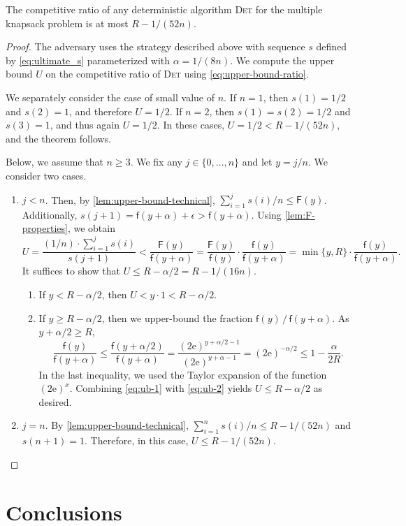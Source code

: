 \documentclass[a4paper,USenglish,cleveref]{lipics-v2019}
\newcommand{\e}{\mathrm{e}}
\newcommand{\R}{\ensuremath{R}}
\newcommand{\f}{\textsf{f}}
\newcommand{\fintegral}{\textsf{F}}
\newcommand{\DET}{\textsc{Det}\xspace}
\newcommand\maciek[1]{\texthl{#1}}
\begin{document}
\begin{theorem}
\label{thm:upper-bound}
The competitive ratio of any deterministic algorithm \DET for the multiple knapsack problem 
is at most $\R - 1/(52 n)$.
\end{theorem}

\begin{proof}
The adversary uses the strategy described above
with sequence $s$ defined by \eqref{eq:ultimate_s} parameterized
with $\alpha = 1/(8n)$. We compute the upper bound $U$ on the competitive ratio
of \DET using \eqref{eq:upper-bound-ratio}.

We separately consider the case of small value of $n$.
If $n = 1$, then $s(1) = 1/2$ and $s(2) = 1$, and therefore 
$U = 1/2$. If $n = 2$, then $s(1) = s(2) = 1/2$ and $s(3) = 1$,
and thus again $U = 1/2$. In these cases, $U = 1/2 < R - 1/(52n)$, and 
the theorem follows. 

Below, we assume that $n \geq 3$.
We fix any $j \in \{0, \ldots, n\}$ and let $y = j/n$.
We consider two cases. 

\begin{enumerate}
\item $j < n$. 
Then, by \cref{lem:upper-bound-technical}, $\sum_{i=1}^j s(i)/n \leq \fintegral(y)$. 
Additionally, $s(j+1) = \f(y+\alpha) + \epsilon > \f(y + \alpha)$. 
Using \cref{lem:F-properties}, we obtain
\begin{equation}
\label{eq:ub-1}
U = \frac{ (1/n) \cdot \sum_{i = 1}^{j} s(i)}{s(j+1)}
  < \frac{\fintegral(y)}{\f(y + \alpha)} 
  = \frac{\fintegral(y)}{\f(y)} \cdot \frac{\f(y)}{\f(y + \alpha)} 
  = \min\{y, \R\} \cdot \frac{\f(y)}{\f(y + \alpha)}.
\end{equation}
It suffices to show that $U \leq R - \alpha/2 = R - 1/(16n)$. 
\begin{enumerate}
\item If $y < \R - \alpha/2$, then $U < y \cdot 1 < \R - \alpha/2$.
\item If $y \geq \R - \alpha/2$, then we upper-bound the fraction
$\f(y) \,/\, \f(y + \alpha)$. As $y + \alpha/2 \geq \R$,
\begin{equation}
\label{eq:ub-2}
  \frac{\f(y)}{\f(y+\alpha)} 
  \leq \frac{\f(y+\alpha/2)}{\f(y+\alpha)} 
  = \frac{(2\e)^{y+\alpha/2-1}}{(2\e)^{y+\alpha-1}} 
  = (2\e)^{-\alpha/2}
  \leq 1-\frac{\alpha}{2\R}.
\end{equation}
In the last inequality, we used the Taylor expansion of the function $(2\e)^x$.
Combining \eqref{eq:ub-1} with \eqref{eq:ub-2} yields 
$U \leq R - \alpha/2$ as desired.
\end{enumerate}

\item $j = n$.
By \cref{lem:upper-bound-technical}, 
$\sum_{i=1}^n s(i)/n \leq R - 1/(52n)$ and $s(n+1) = 1$.
Therefore, in this case, $U \leq R - 1/(52n)$.
\qedhere
\end{enumerate}
\end{proof}

\section{Conclusions}

\maciek{FIXME}




\end{document}
